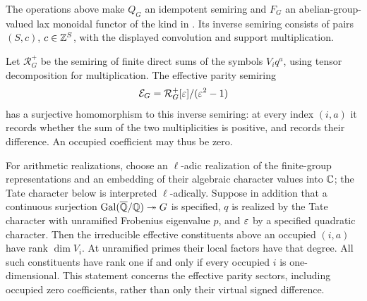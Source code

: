 \begin{proposition}\label{prop:fusion-pair}
The operations above make $Q_G$ an idempotent semiring and $F_G$ an abelian-group-valued lax monoidal functor of the kind in \citet[Theorem 8.5]{CFMM}. Its inverse semiring consists of pairs $(S,c)$, $c\in\mathbb Z^S$, with the displayed convolution and support multiplication.

Let $\mathcal R_G^+$ be the semiring of finite direct sums of the symbols $V_iq^a$, using tensor decomposition for multiplication. The effective parity semiring
\[
 \mathcal E_G=\mathcal R_G^+[\varepsilon]/(\varepsilon^2-1)
\]
has a surjective homomorphism to this inverse semiring: at every index $(i,a)$ it records whether the sum of the two multiplicities is positive, and records their difference. An occupied coefficient may thus be zero.

For arithmetic realizations, choose an $\ell$-adic realization of the finite-group representations and an embedding of their algebraic character values into $\mathbb C$; the Tate character below is interpreted $\ell$-adically. Suppose in addition that a continuous surjection
$\operatorname{Gal}(\overline{\mathbb Q}/\mathbb Q)\twoheadrightarrow G$ is specified, $q$ is realized by the Tate character with unramified Frobenius eigenvalue $p$, and $\varepsilon$ by a specified quadratic character. Then the irreducible effective constituents above an occupied $(i,a)$ have rank $\dim V_i$. At unramified primes their local factors have that degree. All such constituents have rank one if and only if every occupied $i$ is one-dimensional. This statement concerns the effective parity sectors, including occupied zero coefficients, rather than only their virtual signed difference.
\end{proposition}
